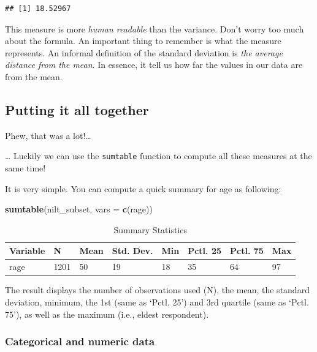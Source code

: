 \documentclass[
]{book}
\newenvironment{Shaded}{\begin{snugshade}}{\end{snugshade}}
\newcommand{\AttributeTok}[1]{\textcolor[rgb]{0.13,0.29,0.53}{#1}}
\newcommand{\FunctionTok}[1]{\textcolor[rgb]{0.13,0.29,0.53}{\textbf{#1}}}
\newcommand{\NormalTok}[1]{#1}
\newcommand{\StringTok}[1]{\textcolor[rgb]{0.31,0.60,0.02}{#1}}
\begin{document}
\begin{verbatim}
## [1] 18.52967
\end{verbatim}

This measure is more \emph{human readable} than the variance. Don't worry too much about the formula. An important thing to remember is what the measure represents. An informal definition of the standard deviation is \emph{the average distance from the mean}. In essence, it tell us how far the values in our data are from the mean.

\hypertarget{putting-it-all-together}{%
\subsection{Putting it all together}\label{putting-it-all-together}}

Phew, that was a lot!\ldots{}

\ldots{} Luckily we can use the \texttt{sumtable} function to compute all these measures at the same time!

It is very simple. You can compute a quick summary for age as following:

\begin{Shaded}
\begin{Highlighting}[]
\FunctionTok{sumtable}\NormalTok{(nilt\_subset, }\AttributeTok{vars =} \FunctionTok{c}\NormalTok{(}\StringTok{\textquotesingle{}rage\textquotesingle{}}\NormalTok{))}
\end{Highlighting}
\end{Shaded}

\begin{table}

\caption{\label{tab:unnamed-chunk-59}Summary Statistics}
\centering
\begin{tabular}[t]{llllllll}
\toprule
Variable & N & Mean & Std. Dev. & Min & Pctl. 25 & Pctl. 75 & Max\\
\midrule
rage & 1201 & 50 & 19 & 18 & 35 & 64 & 97\\
\bottomrule
\end{tabular}
\end{table}

The result displays the number of observations used (N), the mean, the standard deviation, minimum, the 1st (same as `Pctl. 25') and 3rd quartile (same as `Pctl. 75'), as well as the maximum (i.e., eldest respondent).

\hypertarget{categorical-and-numeric-data}{%
\subsubsection{Categorical and numeric data}\label{categorical-and-numeric-data}}
\end{document}

